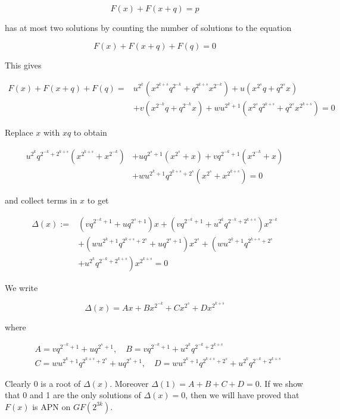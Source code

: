 \documentclass[10pt]{article}
\begin{document}
$$
F(x)+F(x+q)=p
$$

has at most two solutions by counting the number of solutions to the equation

$$
F(x)+F(x+q)+F(q)=0
$$

This gives

$$
\begin{aligned}
F(x)+F(x+q)+F(q)= & u^{2^{k}}\left(x^{2^{k+s}} q^{2^{-k}}+q^{2^{k+s}} x^{2^{-k}}\right)+u\left(x^{2^{s}} q+q^{2^{s}} x\right) \\
& +v\left(x^{2^{-k}} q+q^{2^{-k}} x\right)+w u^{2^{k}+1}\left(x^{2^{s}} q^{2^{k+s}}+q^{2^{s}} x^{2^{k+s}}\right)=0
\end{aligned}
$$

Replace $x$ with $x q$ to obtain

$$
\begin{aligned}
u^{2^{k}} q^{2^{-k}+2^{k+s}}\left(x^{2^{k+s}}+x^{2^{-k}}\right) & +u q^{2^{s}+1}\left(x^{2^{s}}+x\right)+v q^{2^{-k}+1}\left(x^{2^{-k}}+x\right) \\
& +w u^{2^{k}+1} q^{2^{k+s}+2^{s}}\left(x^{2^{s}}+x^{2^{k+s}}\right)=0
\end{aligned}
$$

and collect terms in $x$ to get

$$
\begin{aligned}
\Delta(x):= & \left(v q^{2^{-k}+1}+u q^{2^{s}+1}\right) x+\left(v q^{2^{-k}+1}+u^{2^{k}} q^{2^{-k}+2^{k+s}}\right) x^{2^{-k}} \\
& +\left(w u^{2^{k}+1} q^{2^{k+s}+2^{s}}+u q^{2^{s}+1}\right) x^{2^{s}}+\left(w u^{2^{k}+1} q^{2^{k+s}+2^{s}}\right. \\
& \left.+u^{2^{k}} q^{2^{-k}+2^{k+s}}\right) x^{2^{k+s}}=0
\end{aligned}
$$

We write

$$
\Delta(x)=A x+B x^{2^{-k}}+C x^{2^{s}}+D x^{2^{k+s}}
$$

where

$$
\begin{aligned}
& A=v q^{2^{-k}+1}+u q^{2^{s}+1}, \quad B=v q^{2^{-k}+1}+u^{2^{k}} q^{2^{-k}+2^{k+s}} \\
& C=w u^{2^{k}+1} q^{2^{k+s}+2^{s}}+u q^{2^{s}+1}, \quad D=w u^{2^{k}+1} q^{2^{k+s}+2^{s}}+u^{2^{k}} q^{2^{-k}+2^{k+s}}
\end{aligned}
$$

Clearly 0 is a root of $\Delta(x)$. Moreover $\Delta(1)=A+B+C+D=0$. If we show that 0 and 1 are the only solutions of $\Delta(x)=0$, then we will have proved that $F(x)$ is APN on $G F\left(2^{3 k}\right)$.
\end{document}
